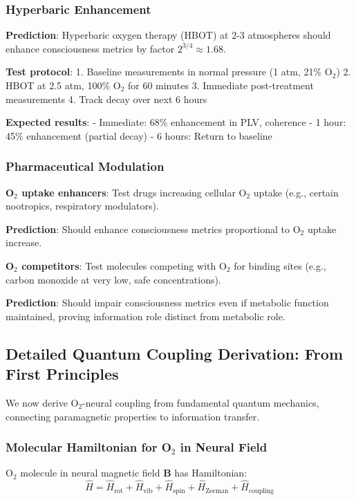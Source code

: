 \documentclass[11pt,onecolumn]{article}
\begin{document}
\subsubsection{Hyperbaric Enhancement}

\textbf{Prediction}: Hyperbaric oxygen therapy (HBOT) at 2-3 atmospheres should enhance consciousness metrics by factor $2^{3/4} \approx 1.68$.

\textbf{Test protocol}:
1. Baseline measurements in normal pressure (1 atm, 21\% O$_2$)
2. HBOT at 2.5 atm, 100\% O$_2$ for 60 minutes
3. Immediate post-treatment measurements
4. Track decay over next 6 hours

\textbf{Expected results}:
- Immediate: 68\% enhancement in PLV, coherence
- 1 hour: 45\% enhancement (partial decay)
- 6 hours: Return to baseline

\subsubsection{Pharmaceutical Modulation}

\textbf{O$_2$ uptake enhancers}: Test drugs increasing cellular O$_2$ uptake (e.g., certain nootropics, respiratory modulators).

\textbf{Prediction}: Should enhance consciousness metrics proportional to O$_2$ uptake increase.

\textbf{O$_2$ competitors}: Test molecules competing with O$_2$ for binding sites (e.g., carbon monoxide at very low, safe concentrations).

\textbf{Prediction}: Should impair consciousness metrics even if metabolic function maintained, proving information role distinct from metabolic role.

\subsection{Detailed Quantum Coupling Derivation: From First Principles}

We now derive O$_2$-neural coupling from fundamental quantum mechanics, connecting paramagnetic properties to information transfer.

\subsubsection{Molecular Hamiltonian for O$_2$ in Neural Field}

O$_2$ molecule in neural magnetic field $\mathbf{B}$ has Hamiltonian:
\begin{equation}
\hat{H} = \hat{H}_{\text{rot}} + \hat{H}_{\text{vib}} + \hat{H}_{\text{spin}} + \hat{H}_{\text{Zeeman}} + \hat{H}_{\text{coupling}}
\end{equation}
\end{document}
